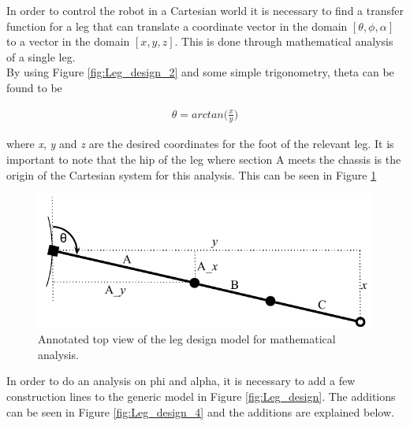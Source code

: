 In order to control the robot in a Cartesian world it is necessary to find a transfer function for a leg that can translate a coordinate vector in the domain $[\theta,\phi,\alpha]$ to a vector in the domain $[x,y,z]$. This is done through mathematical analysis of a single leg.\\

By using Figure \ref{fig:Leg_design_2} and some simple trigonometry, theta can be found to be

\begin{align}
\label{eq:IKstart}
\theta = arctan\Big(\frac{x}{y}\Big)
\end{align}

where \textit{x}, \textit{y} and \textit{z} are the desired coordinates for the foot of the relevant leg. It is important to note that the hip of the leg where section A meets the chassis is the origin of the Cartesian system for this analysis. This can be seen in Figure \ref{fig:Leg_design_3}

\FloatBarrier
\begin{figure}[h]
\centering
\includegraphics[scale = 1]{pics/Leg_design_3.pdf}
\caption{Annotated top view of the leg design model for mathematical analysis.}
\label{fig:Leg_design_3}
\end{figure}
\FloatBarrier

In order to do an analysis on phi and alpha, it is necessary to add a few construction lines to the generic model in Figure \ref{fig:Leg_design}. The additions can be seen in Figure \ref{fig:Leg_design_4} and the additions are explained below.

